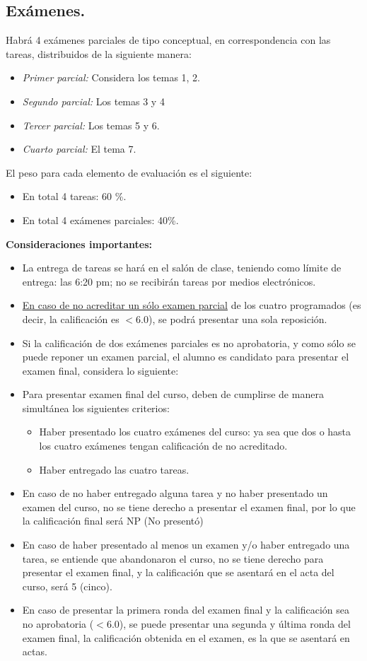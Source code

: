 \documentclass[12pt]{article}
\begin{document}
\subsection{Exámenes.}
Habrá 4 exámenes parciales de tipo conceptual, en correspondencia con las tareas, distribuidos de la siguiente manera:
\begin{itemize}
\item \emph{Primer parcial:} Considera los temas 1, 2.
\item \emph{Segundo parcial:} Los temas 3 y 4
\item \emph{Tercer parcial:} Los temas 5 y 6.
\item \emph{Cuarto parcial:} El tema 7.
\end{itemize}
El peso para cada elemento de evaluación es el siguiente:
\begin{itemize}
\setlength{\itemsep}{0mm}
\item En total 4 tareas: \hspace{2cm} 60 \%.
\item En total 4 exámenes parciales: 40\%.
\end{itemize}
\textbf{Consideraciones importantes:}
\begin{itemize}
\setlength{\itemsep}{0mm}
\item La entrega de tareas se hará en el salón de clase, teniendo como límite de entrega: las 6:20 pm; no se recibirán tareas por medios electrónicos.
\item \underline{En caso de no acreditar un sólo examen parcial} de los cuatro programados (es decir, la calificación es $<6.0$), se podrá presentar una sola reposición.
\item Si la calificación de dos exámenes parciales es no aprobatoria, y como sólo se puede reponer un examen parcial, el alumno es candidato para presentar el examen final, considera lo siguiente:
\item Para presentar examen final del curso, deben de cumplirse de manera simultánea los siguientes criterios:
\begin{itemize}
\item Haber presentado los cuatro exámenes del curso: ya sea que dos o hasta los cuatro exámenes tengan calificación de no acreditado.
\item Haber entregado las cuatro tareas.
\end{itemize}  
\item En caso de no haber entregado alguna tarea y no haber presentado un examen del curso, no se tiene derecho a  presentar el examen final, por lo que la calificación final será NP (No presentó)
\item En caso de haber presentado al menos un examen y/o haber entregado una tarea, se entiende que abandonaron el curso, no se tiene derecho para presentar el examen final, y la calificación que se asentará en el acta del curso, será 5 (cinco).
\item En caso de presentar la primera ronda del examen final y la calificación sea no aprobatoria ($<6.0$), se puede presentar una segunda y última ronda del examen final, la calificación obtenida en el examen, es la que se asentará en actas.
\end{itemize}
\end{document}
